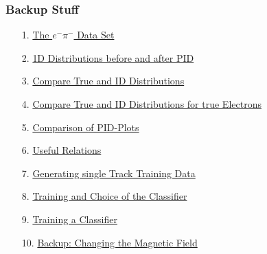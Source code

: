 \documentclass[xcolor=table, xcolor=dvipsnames]{beamer}
\begin{document}
\begin{frame}
 \frametitle{Backup Stuff}
 \label{bup}
 \footnotesize
 
 \begin{itemize}
   \item[1.] \hyperlink{bdataSet}{The $e^{-}\pi^{-}$ Data Set} {\color{blue}{(\ref{bdataSet})}}
   \item[2.] \hyperlink{1dDists}{1D Distributions before and after PID} {\color{blue}{(\ref{1dDists})}}
   \item[3.] \hyperlink{1dDistsTrue}{Compare True and ID Distributions} {\color{blue}{(\ref{1dDistsTrue})}}
   \item[4.] \hyperlink{1dDistsTrueTrue}{Compare True and ID Distributions for true Electrons} {\color{blue}{(\ref{1dDistsTrueTrue})}}
   \item[5.] \hyperlink{compPid}{Comparison of PID-Plots} {\color{blue}{(\ref{compPid})}}
   \item[6.] \hyperlink{ratio}{Useful Relations} {\color{blue}{(\ref{ratio})}} 
   \item[7.] \hyperlink{readConf}{Generating single Track Training Data}  {\color{blue}{(\ref{readConf})}} 
   \item[8.] \hyperlink{trainConf}{Training and Choice of the Classifier} {\color{blue}{(\ref{trainConf})}} 
   \item[9.] \hyperlink{train}{Training a Classifier}  {\color{blue}{(\ref{train})}} 
   \item[10.] \hyperlink{bmField}{Backup: Changing the Magnetic Field} {\color{blue}{(\ref{bmField})}} 
 \end{itemize}
 
\end{frame}
\end{document}
